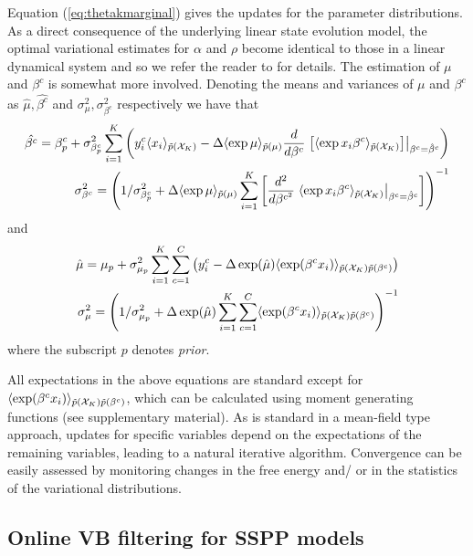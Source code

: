 \documentclass{article}
\begin{document}
Equation (\ref{eq:thetakmarginal}) gives the updates for the parameter distributions. As a direct
consequence of the underlying linear state evolution model, the optimal variational estimates for
$\alpha$ and $\rho$ become identical to those in a linear dynamical system and so we refer the reader
to \cite{Beal_2003b} for details. The estimation of $\mu$ and $\beta^c$ is somewhat more involved.
Denoting the means and variances of $\mu$ and $\beta^c$ as $\hat{\mu}, \hat{\beta^c}$ and
$\sigma^2_\mu, \sigma^2_{\beta^c}$ respectively we have that \begin{subequations} \begin{align}
	\hat{\beta^c} = \beta^c_p + \sigma^2_{\beta^c_p}\sum_{i=1}^K \left(y^c_i\langle x_i
	\rangle_{\tilde{p}(\mathcal{X}_K)}- \Delta\langle \exp \mu \rangle_{\tilde{p}(\mu)} \frac{d}{d\beta^c}\left.
	\left[\langle \exp{x_{i}\beta^c}\rangle_{\tilde{p}(\mathcal{X}_K)}\right] \right| _{\beta^c =
	\hat{\beta}^c}  \right) \\ \sigma^2_{\beta^c} = \left(1 / \sigma^2_{\beta^c_p} +
	\Delta\langle \exp \mu \rangle_{\tilde{p}(\mu)} \sum_{i=1}^K  \left[\frac{d^2}{d\beta^{c^2}} \left.
	\langle \exp{x_i\beta^c}\rangle_{\tilde{p}(\mathcal{X}_K)}\right| _{\beta^c =
	\hat{\beta}^c}\right]\right)^{-1} \end{align} \end{subequations} 	\noindent and
	\begin{subequations} \begin{align} \hat{\mu} = \mu_p +
		\sigma^2_{\mu_p}\sum_{i=1}^K\sum_{c=1}^C \left(y^c_i - \Delta\exp(\hat{\mu}) \langle
		\exp(\beta^cx_i)\rangle_{\tilde{p}(\mathcal{X}_K)\tilde{p}(\beta^c)} \right) \\
		\sigma^2_{\mu} = \left(1 / \sigma^2_{\mu_p} + \Delta\exp(\hat{\mu})\sum_{i=1}^K
		\sum_{c=1}^C \langle \exp(\beta^cx_i)\rangle_{\tilde{p}(\mathcal{X}_K)\tilde{p}(\beta^c)} \right)^{-1}
	\end{align} \end{subequations} 	\noindent where the subscript $p$ denotes \emph{prior}.

All expectations in the above equations are standard except for $\langle
\exp(\beta^cx_i)\rangle_{\tilde{p}(\mathcal{X}_K)\tilde{p}(\beta^c)}$, which can be calculated using moment generating
functions (see supplementary material).  As is standard in a mean-field type approach, updates for
specific variables depend on the expectations of the remaining variables, leading to a natural
iterative algorithm. Convergence can be easily assessed by monitoring changes in the free energy
and/ or in the statistics of the variational distributions.  \subsection{Online VB filtering for
SSPP models}\label{sec:OL}
\end{document}
